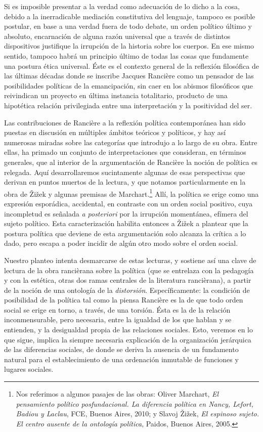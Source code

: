 \documentclass{book}
\begin{document}
Si es imposible presentar a la verdad como adecuación de lo dicho a la
cosa, debido a la inerradicable mediación constitutiva del lenguaje,
tampoco es posible postular, en base a una verdad fuera de todo debate,
un orden político último y absoluto, encarnación de alguna razón
universal que a través de distintos dispositivos justifique la irrupción
de la historia sobre los cuerpos. En ese mismo sentido, tampoco habrá un
principio último de todas las cosas que fundamente una postura ética
universal. Éste es el contexto general de la reflexión filosófica de las
últimas décadas donde se inscribe Jacques Rancière como un pensador de
las posibilidades políticas de la emancipación, sin caer en los abismos
filosóficos que reivindican un proyecto en última instancia totalitario,
producto de una hipotética relación privilegiada entre una
interpretación y la positividad del ser.

Las contribuciones de Rancière a la reflexión política contemporánea han
sido puestas en discusión en múltiples ámbitos teóricos y políticos, y
hay así numerosas miradas sobre las categorías que introdujo a lo largo
de su obra. Entre ellas, ha primado un conjunto de interpretaciones que
consideran, en términos generales, que al interior de la argumentación
de Rancière la noción de política es relegada. Aquí desarrollaremos
sucintamente algunas de esas perspectivas que derivan en puntos muertos
de la lectura, y que notamos particularmente en la obra de Žižek y
algunas premisas de Marchart.\footnote{Nos referimos a algunos pasajes
  de las obras: Oliver Marchart, \emph{El pensamiento político
  posfundacional. La diferencia política en Nancy, Lefort, Badiou y
  Laclau}, FCE, Buenos Aires, 2010; y Slavoj Žižek, \emph{El espinoso
  sujeto. El centro ausente de la ontología política}, Paidos, Buenos
  Aires, 2005.} Allí, la política se erige como una expresión
esporádica, accidental, en contraste con un orden social positivo, cuya
incompletud es señalada \emph{a posteriori} por la irrupción momentánea,
efímera del sujeto político. Esta caracterización habilita entonces a
Žižek a plantear que la postura política que deviene de esta
argumentación solo alcanza la crítica a lo dado, pero escapa a poder
incidir de algún otro modo sobre el orden social.

Nuestro planteo intenta desmarcarse de estas lecturas, y sostiene así
una clave de lectura de la obra rancièrana sobre la política (que se
entrelaza con la pedagogía y con la estética, otras dos ramas centrales
de la literatura rancièrana), a partir de la noción de una ontología de
la \emph{distorsión}. Específicamente: la condición de posibilidad de la
política tal como la piensa Rancière es la de que todo orden social se
erige en torno, a través, de una torsión. Ésta es la de la relación
inconmensurable, pero necesaria, entre la igualdad de los que hablan y
se entienden, y la desigualdad propia de las relaciones sociales. Esto,
veremos en lo que sigue, implica la siempre necesaria explicación de la
organización jerárquica de las diferencias sociales, de donde se deriva
la ausencia de un fundamento natural para el establecimiento de una
ordenación inmutable de funciones y lugares sociales.
\end{document}
